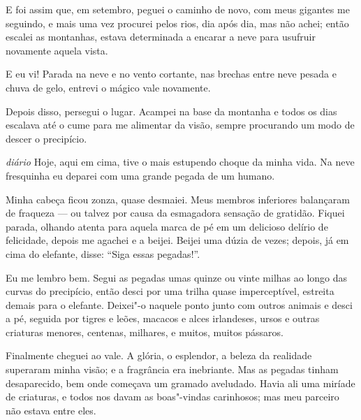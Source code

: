 E foi assim que, em setembro, peguei o caminho de novo, com meus gigantes me
seguindo, e mais uma vez procurei pelos rios, dia após dia, mas não achei;
então escalei as montanhas, estava determinada a encarar a neve para
usufruir novamente aquela vista.

E eu vi! Parada na neve e no vento cortante, nas brechas entre neve pesada e
chuva de gelo, entrevi o mágico vale novamente.

Depois disso, persegui o lugar. Acampei na base da montanha e todos os dias
escalava até o cume para me alimentar da visão, sempre procurando um modo de
descer o precipício.

\textit{diário} Hoje, aqui em cima, tive o mais estupendo choque da minha vida. Na neve
fresquinha eu deparei com uma grande pegada de um humano.

Minha cabeça ficou zonza, quase desmaiei. Meus membros inferiores balançaram de
fraqueza --- ou talvez por causa da esmagadora sensação de gratidão. Fiquei parada, olhando
atenta para aquela marca de pé em um delicioso delírio de felicidade, depois
me agachei e a beijei. Beijei uma dúzia de vezes; depois, já em cima do elefante, disse: “Siga essas pegadas!”.

Eu me lembro bem. Segui as pegadas umas quinze ou vinte milhas ao longo das curvas do
precipício, então desci por uma trilha quase imperceptível, estreita
demais para o elefante. Deixei"-o naquele ponto junto com outros animais e
desci a pé, seguida por tigres e leões, macacos e alces irlandeses, ursos e outras
criaturas menores, centenas, milhares, e muitos, muitos pássaros.

Finalmente cheguei ao vale. A glória, o esplendor, a beleza da realidade superaram
minha visão; e a fragrância era inebriante. Mas as pegadas tinham desaparecido,
bem onde começava um gramado aveludado. Havia ali uma miríade de
criaturas, e todos nos davam as boas"-vindas carinhosos; mas meu parceiro não estava entre eles.

